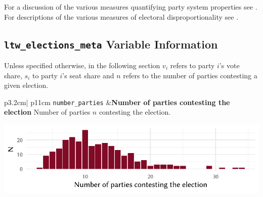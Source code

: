 \documentclass[
]{scrartcl}
\begin{document}
For a discussion of the various measures quantifying party system
properties see \textcite{niedermayerAnalyseParteiensystemen2013}. For
descriptions of the various measures of electoral disproportionality see
\textcite{karpovMeasurementDisproportionalityProportional2008}.

\hypertarget{ltw_elections_meta-variable-information}{%
\subsection{\texorpdfstring{\texttt{ltw\_elections\_meta} Variable
Information}{ltw\_elections\_meta Variable Information}}\label{ltw_elections_meta-variable-information}}

Unless specified otherwise, in the following section \(v_i\) refers to
party \(i\)'s vote share, \(s_i\) to party \(i\)'s seat share and \(n\)
refers to the number of parties contesting a given election.

\begin{longtable}{p{3.2cm}| p{11cm}}
\texttt{number\_parties} &\textbf{Number of parties contesting the election}\newline 
Number of parties $n$ contesting the election.



\hspace*{.25cm}
\begin{minipage}[t]{\linewidth }
\vspace{0pt}
\includegraphics[width = \linewidth]{cbfiles/npartiesplot.pdf}
\end{minipage}



\end{longtable}
\end{document}
